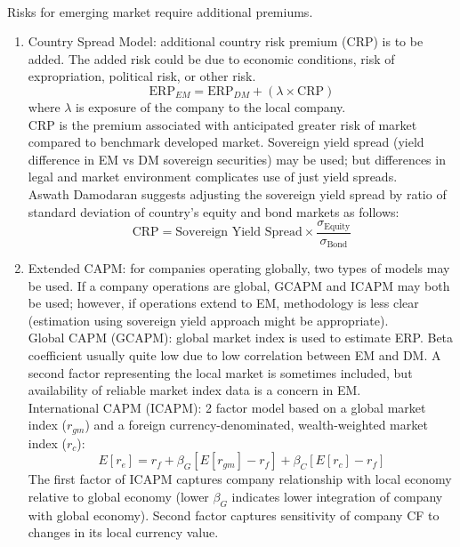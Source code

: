 \begin{method} \\
Risks for emerging market require additional premiums.
\begin{enumerate}[label=\roman*.]
\setlength{\itemsep}{0pt}
\item Country Spread Model: additional country risk premium (CRP) is to be added. The added risk could be due to economic conditions, risk of expropriation, political risk, or other risk.
\begin{equation}
\text{ERP}_{EM} = \text{ERP}_{DM} + (\lambda \times \text{CRP}) \nonumber
\end{equation}
where $\lambda$ is exposure of the company to the local company.\\
CRP is the premium associated with anticipated greater risk of market compared to benchmark developed market. Sovereign yield spread (yield difference in EM vs DM sovereign securities) may be used; but differences in legal and market environment complicates use of just yield spreads.\\
Aswath Damodaran suggests adjusting the sovereign yield spread by ratio of standard deviation of country's equity and bond markets as follows:
\begin{equation}
\text{CRP} = \text{Sovereign Yield Spread} \times \frac{\sigma_{\text{Equity}}}{\sigma_{\text{Bond}}} \nonumber
\end{equation}
\item Extended CAPM: for companies operating globally, two types of models may be used. If a company operations are global, GCAPM and ICAPM may both be used; however, if operations extend to EM, methodology is less clear (estimation using sovereign yield approach might be appropriate). \\
Global CAPM (GCAPM): global market index is used to estimate ERP. Beta coefficient usually quite low due to low correlation between EM and DM. A second factor representing the local market is sometimes included, but availability of reliable market index data is a concern in EM.\\
International CAPM (ICAPM): 2 factor model based on a global market index ($r_{gm}$) and a foreign currency-denominated, wealth-weighted market index ($r_c$):
\begin{equation}
E[r_e] = r_f + \beta_{G}[E[r_{gm}] - r_f] + \beta_{C}[E[r_c] - r_f] \nonumber
\end{equation}
The first factor of ICAPM captures company relationship with local economy relative to global economy (lower $\beta_{G}$ indicates lower integration of company with global economy). Second factor captures sensitivity of company CF to changes in its local currency value.\\
\end{enumerate}
\end{method}